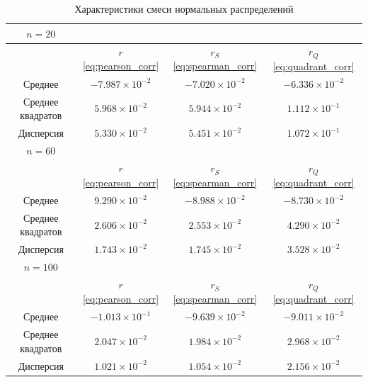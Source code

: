 \documentclass[12pt,a4paper]{article}
\begin{document}
	\begin{table}[htbp!]
		\centering
		\begin{tabular}{ |c|c|c|c| }
			\hline
			\( n = 20 \) & & & \\
			\hline
			& \( r \) \eqref{eq:pearson_corr} & \( r_S \) \eqref{eq:spearman_corr} &
			\( r_Q \) \eqref{eq:quadrant_corr} \\
			\hline
			Среднее & \( -7.987 \times 10^{-2} \) & \( -7.020 \times 10^{-2} \) &
			\( -6.336 \times 10^{-2} \) \\
			\hline
			Среднее квадратов & \( 5.968 \times 10^{-2} \) &
			\( 5.944 \times 10^{-2} \) & \( 1.112 \times 10^{-1} \) \\
			\hline
			Дисперсия & \( 5.330 \times 10^{-2} \) &
			\( 5.451 \times 10^{-2} \) & \( 1.072 \times 10^{-1} \) \\
			\hline
			\hline
			\( n = 60 \) & & & \\
			\hline
			& \( r \) \eqref{eq:pearson_corr} & \( r_S \) \eqref{eq:spearman_corr} &
			\( r_Q \) \eqref{eq:quadrant_corr} \\
			\hline
			Среднее & \( 9.290 \times 10^{-2} \) & \( -8.988 \times 10^{-2} \) &
			\( -8.730 \times 10^{-2} \) \\
			\hline
			Среднее квадратов & \( 2.606 \times 10^{-2} \) &
			\( 2.553 \times 10^{-2} \) & \( 4.290 \times 10^{-2} \) \\
			\hline
			Дисперсия & \( 1.743 \times 10^{-2} \) &
			\( 1.745 \times 10^{-2} \) & \( 3.528 \times 10^{-2} \) \\
			\hline
			\hline
			\( n = 100 \) & & & \\
			\hline
			& \( r \) \eqref{eq:pearson_corr} & \( r_S \) \eqref{eq:spearman_corr} &
			\( r_Q \) \eqref{eq:quadrant_corr} \\
			\hline
			Среднее & \( -1.013 \times 10^{-1} \) & \( -9.639 \times 10^{-2} \) &
			\( -9.011 \times 10^{-2} \) \\
			\hline
			Среднее квадратов & \( 2.047 \times 10^{-2} \) &
			\( 1.984 \times 10^{-2} \) & \( 2.968 \times 10^{-2} \) \\
			\hline
			Дисперсия & \( 1.021 \times 10^{-2} \) &
			\( 1.054 \times 10^{-2} \) & \( 2.156 \times 10^{-2} \) \\
			\hline
		\end{tabular}
		\caption{Характеристики смеси нормальных распределений}
	\end{table}
\end{document}
